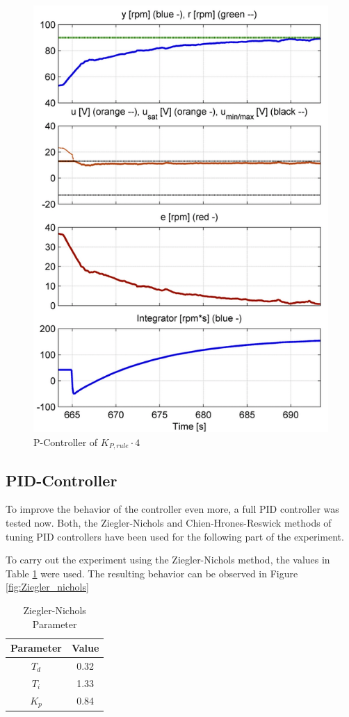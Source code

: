 \begin{figure}[H]
\begin{center}
\includegraphics[width=0.5\linewidth]{images/general/PI/PI_RiseTime4}
\end{center}
\caption{P-Controller of $ K_{P,rule}\cdot4$}
\label{fig:PI_RiseTime4}
\end{figure}

\clearpage
\subsection{PID-Controller}

To improve the behavior of the controller even more, a full PID controller was tested now.
Both, the Ziegler-Nichols and Chien-Hrones-Reswick methods of tuning PID controllers have been used for the following part of the experiment. 

To carry out the experiment using the Ziegler-Nichols method, the values in Table \ref{tab:zn_params} were used.
The resulting behavior can be observed in Figure \ref{fig:Ziegler_nichols}

\begin{table}[H]
\begin{center}
\begin{tabular}{ |c|c| } 
 \hline
 Parameter & Value\\
 \hline
 $T_{d}$ & 0.32\\  
 \hline
 $T_{i}$ & 1.33\\
 \hline
 $K_{p}$ & 0.84\\
 \hline
\end{tabular}
\end{center}
\caption{Ziegler-Nichols Parameter}
\label{tab:zn_params}
\end{table}

